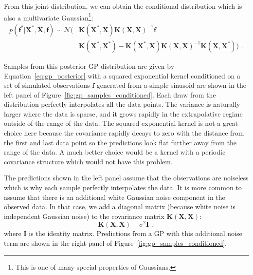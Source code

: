 \documentclass[12pt,dvipsnames]{report}
\renewcommand{\vec}[1]{\boldsymbol{\mathbf{#1}}}
\newcommand{\hquad}{~~}
\begin{document}
From this joint distribution, we can obtain the conditional  distribution
\citep[see appendix A2 in ][]{rasmussen2006} which is also a multivariate Gaussian\footnote{
    This is one of many special properties of Gaussians.
}:
\begin{align}
    p(\mathbf{f}^{*} \lvert \vec X^{*}, \vec X, \mathbf{f} )\sim \mathcal{N}( & \vec K\left(\vec X^*, \vec X\right) \vec K(\vec X, \vec X)^{-1} \mathbf{f}                                                          \\
                                                                              & \vec K\left(\vec X^*, \vec X^*\right)  -\vec K\left(\vec X^*, \vec X \right) \vec K(\vec X, \vec X)^{-1} \vec K (\vec X, \vec X^*))
    \hquad.
    \label{eq:gp_posterior}
\end{align}

Samples from this posterior GP distribution are given by
Equation~\ref{eq:gp_posterior} with a squared exponential kernel conditioned on
a set of simulated observations $\vec{f}$ generated from a simple sinusoid are
shown in the left panel of Figure~\ref{fig:gp_samples_conditioned}. Each draw
from the distribution perfectly interpolates all the data points. The variance
is naturally larger where the data is sparse, and it 
grows rapidly in the extrapolative regime outside of the range of
the data. The squared exponential kernel is not a great choice here because the
covariance rapidly decays to zero with the distance from the first and last
data point so the predictions look flat further away from the range of the
data. A much better choice would be a kernel with a periodic covariance
structure which would not have this problem.

The predictions shown in the left panel assume that the observations are
noiseless which is why each sample perfectly interpolates the data. It is more
common to assume that there is an additional white Gaussian noise component in
the observed data. In that case, we add a diagonal matrix (because white noise
is independent Gaussian noise) to the covariance matrix
$\vec{K}(\vec{X},\vec{X})$:
\begin{equation}
    \vec{K}(\vec{X},\vec{X}) + \sigma^2\vec{I}
    \hquad,
\end{equation}
where $\vec{I}$ is the identity matrix. Predictions from a GP with this additional
noise term are shown in the right panel of Figure~\ref{fig:gp_samples_conditioned}.
\end{document}
